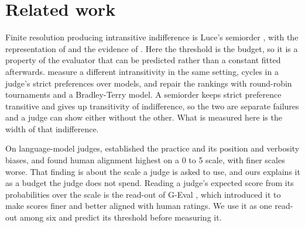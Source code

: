 \documentclass{article}
\theoremstyle{definition}
\theoremstyle{remark}
\begin{document}
\section{Related work}
\label{sec:related}

Finite resolution producing intransitive indifference is Luce's semiorder \citep{luce1956}, with the representation of \citet{scott1958} and the evidence of \citet{tversky1969}.
Here the threshold is the budget, so it is a property of the evaluator that can be predicted rather than a constant fitted afterwards.
\citet{xu2025nontransitivity} measure a different intransitivity in the same setting, cycles in a judge's strict preferences over models, and repair the rankings with round-robin tournaments and a Bradley-Terry model.
A semiorder keeps strict preference transitive and gives up transitivity of indifference, so the two are separate failures and a judge can show either without the other.
What is measured here is the width of that indifference.

On language-model judges, \citet{zheng2023} established the practice and its position and verbosity biases, and \citet{li2026grading} found human alignment highest on a 0 to 5 scale, with finer scales worse.
That finding is about the scale a judge is asked to use, and ours explains it as a budget the judge does not spend.
Reading a judge's expected score from its probabilities over the scale is the read-out of G-Eval \citep{liu2023geval}, which introduced it to make scores finer and better aligned with human ratings.
We use it as one read-out among six and predict its threshold before measuring it.
\end{document}
